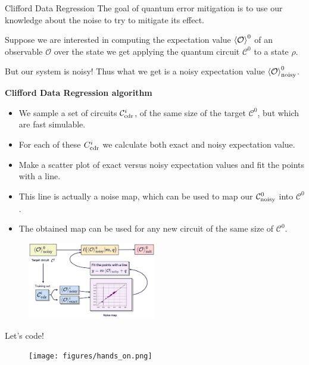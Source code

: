 \documentclass[aspectratio=169, 8pt, xcolor={svgnames}, hyperref={linkcolor=black}]{beamer}
\begin{document}
\begin{frame}{Clifford Data Regression}
\textcolor{carnelian}{The goal of quantum error mitigation is to use our knowledge about 
the noise to try to mitigate its effect.} \pause

Suppose we are interested in computing the expectation value $\braket{\mathcal{O}}^0$ 
of an observable $\mathcal{O}$
over the state we get applying the quantum circuit $\mathcal{C}^0$ to a state $\rho$. \pause

But our system is noisy! Thus what we get is a noisy expectation value $\braket{\mathcal{O}}^0_{\rm noisy}$. \pause

\begin{multicols}{2}
\textbf{Clifford Data Regression algorithm}
\begin{itemize}[noitemsep]
\item[1.] We sample a set of circuits $\mathcal{C}^i_{\rm cdr}$, of the 
same size of the target $\mathcal{C}^0$, but which are fast simulable.
\item[2.] For each of these $C^i_{\rm cdr}$ we calculate both exact and 
noisy expectation value.
\item[3.] Make a scatter plot of exact versus noisy expectation values and fit 
the points with a line.
\item[4.] This line is actually a noise map, which can be used to map our $\mathcal{C}^0_{\rm noisy}$
into $\mathcal{C}^0$.
\item[5.] The obtained map can be used for any new circuit of the same size of $\mathcal{C}^0$.
\end{itemize}
\begin{figure}
    \includegraphics[width=0.5\textwidth]{figures/cdr.png}
\end{figure}
\end{multicols}

\end{frame}

\begin{frame}
\centering
\Huge Let's code!
\begin{figure}
   \texttt{[image: figures/hands\_on.png]}
\end{figure}
\end{frame}
\end{document}
